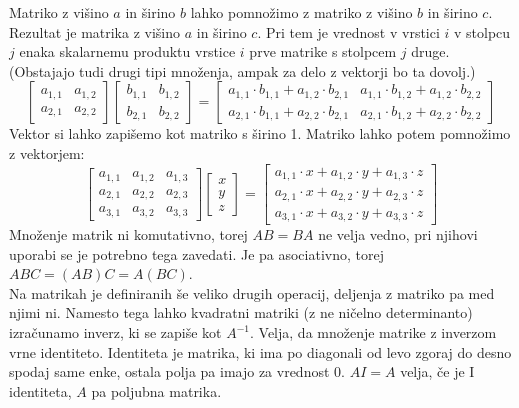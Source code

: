 \documentclass[a4paper, 12px]{article}
\begin{document}
    Matriko z višino $a$ in širino $b$ lahko pomnožimo z matriko z višino $b$ in širino $c$. Rezultat je matrika
    z višino $a$ in širino $c$. Pri tem je vrednost v vrstici $i$ v stolpcu $j$ enaka skalarnemu produktu
    vrstice $i$ prve matrike s stolpcem $j$ druge. (Obstajajo tudi drugi tipi množenja, ampak za delo z vektorji bo ta dovolj.)
    \cite{MatrixWiki}
    $$\begin{bmatrix}
        a_{1,1} & a_{1,2} \\ a_{2,1} & a_{2,2}
    \end{bmatrix} \begin{bmatrix}
        b_{1,1} & b_{1,2} \\ b_{2,1} & b_{2,2}
    \end{bmatrix} = \begin{bmatrix}
        a_{1,1} \cdot b_{1,1} + a_{1,2} \cdot b_{2,1} & a_{1,1} \cdot b_{1,2} + a_{1,2} \cdot b_{2,2} \\
        a_{2,1} \cdot b_{1,1} + a_{2,2} \cdot b_{2,1} & a_{2,1} \cdot b_{1,2} + a_{2,2} \cdot b_{2,2}
    \end{bmatrix}$$
    Vektor si lahko zapišemo kot matriko s širino 1. Matriko lahko potem pomnožimo z vektorjem:
    $$\begin{bmatrix}
        a_{1,1} & a_{1,2} & a_{1,3} \\
        a_{2,1} & a_{2,2} & a_{2,3} \\
        a_{3,1} & a_{3,2} & a_{3,3}
    \end{bmatrix} \begin{bmatrix}
        x \\ y \\ z
    \end{bmatrix} = \begin{bmatrix}
        a_{1,1} \cdot x + a_{1,2} \cdot y + a_{1,3} \cdot z\\
        a_{2,1} \cdot x + a_{2,2} \cdot y + a_{2,3} \cdot z\\
        a_{3,1} \cdot x + a_{3,2} \cdot y + a_{3,3} \cdot z
    \end{bmatrix}$$
    Množenje matrik ni komutativno, torej $AB = BA$ ne velja vedno, pri njihovi uporabi se je potrebno tega zavedati. 
    Je pa asociativno, torej $ABC = (AB)C = A(BC)$.\\

    Na matrikah je definiranih še veliko drugih operacij, deljenja z matriko pa med njimi ni. Namesto tega
    lahko kvadratni matriki (z ne ničelno determinanto) izračunamo inverz, ki se zapiše kot $A^{-1}$. Velja,
    da množenje matrike z inverzom vrne identiteto. Identiteta je matrika, ki ima po diagonali od levo zgoraj do desno
    spodaj same enke, ostala polja pa imajo za vrednost $0$. $AI = A$ velja, če je I identiteta, $A$ pa poljubna matrika.
    \cite{MatrixWiki}
    
\end{document}

